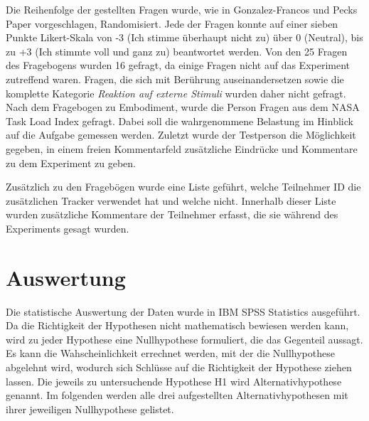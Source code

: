 Die Reihenfolge der gestellten Fragen wurde, wie in Gonzalez-Francos und Pecks Paper vorgeschlagen, Randomisiert. Jede der Fragen konnte auf einer sieben Punkte Likert-Skala von -3 (Ich stimme überhaupt nicht zu) über 0 (Neutral), bis zu +3 (Ich stimmte voll und ganz zu) beantwortet werden.
Von den 25 Fragen des Fragebogens wurden 16 gefragt, da einige Fragen nicht auf das Experiment zutreffend waren. Fragen, die sich mit Berührung auseinandersetzen sowie die komplette Kategorie \textit{Reaktion auf externe Stimuli} wurden daher nicht gefragt.
Nach dem Fragebogen zu Embodiment, wurde die Person Fragen aus dem NASA Task Load Index \cite{HART1988} gefragt. Dabei soll die wahrgenommene Belastung im Hinblick auf die Aufgabe gemessen werden.
Zuletzt wurde der Testperson die Möglichkeit gegeben, in einem freien Kommentarfeld zusätzliche Eindrücke und Kommentare zu dem Experiment zu geben.

Zusätzlich zu den Fragebögen wurde eine Liste geführt, welche Teilnehmer ID die zusätzlichen Tracker verwendet hat und welche nicht. Innerhalb dieser Liste wurden zusätzliche Kommentare der Teilnehmer erfasst, die sie während des Experiments gesagt wurden.

\section{Auswertung}
Die statistische Auswertung der Daten wurde in IBM SPSS Statistics ausgeführt. 
Da die Richtigkeit der Hypothesen nicht mathematisch bewiesen werden kann, wird zu jeder Hypothese eine Nullhypothese formuliert, die das Gegenteil aussagt. Es kann die Wahscheinlichkeit errechnet werden, mit der die Nullhypothese abgelehnt wird, wodurch sich Schlüsse auf die Richtigkeit der Hypothese ziehen lassen. Die jeweils zu untersuchende Hypothese H1 wird Alternativhypothese genannt. Im folgenden werden alle drei aufgestellten Alternativhypothesen mit ihrer jeweiligen Nullhypothese gelistet.

